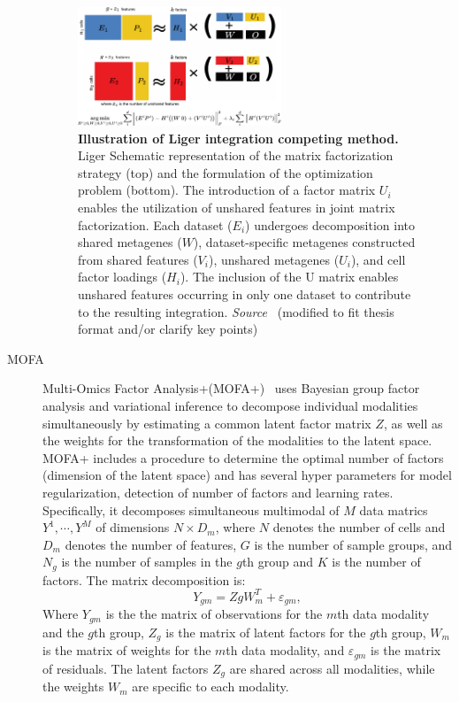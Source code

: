 \begin{description}
  \begin{figure}[!ht]
  	\centering
  	\includegraphics[width=0.6\textwidth]{Alg_Liger/fig}
  	\vspace{0.1cm}
  	\caption[Illustration of Liger integration competing method.]{\textbf{Illustration of Liger integration competing method.} Liger Schematic representation of the matrix factorization strategy (top) and the formulation of the optimization problem (bottom). The introduction of a factor matrix $U_i$ enables the utilization of unshared features in joint matrix factorization. Each dataset ($E_i$) undergoes decomposition into shared metagenes ($W$), dataset-specific metagenes constructed from shared features ($V_i$), unshared metagenes ($U_i$), and cell factor loadings ($H_i$). The inclusion of the U matrix enables unshared features occurring in only one dataset to contribute to the resulting integration. \emph{Source~\cite{kriebel2022uinmf}} (modified to fit thesis format and/or clarify key points)
  }
  	\label{fig:Alg_Liger}
  \end{figure}

  \item[MOFA]
  Multi-Omics Factor Analysis+(MOFA+)~\citep{argelaguet2020mofa+} uses Bayesian group factor analysis and variational inference to decompose individual modalities simultaneously by estimating a common latent factor matrix $Z$, as well as the weights for the transformation of the modalities to the latent space. MOFA+ includes a procedure to determine the optimal number of factors (dimension of the latent space) and has several hyper parameters for model regularization, detection of number of factors and learning rates. Specifically, it decomposes simultaneous multimodal of $M$ data matrics $Y^1, \cdots, Y^M$ of dimensions $N\times D_m$, where $N$ denotes the number of cells and $D_m$ denotes the number of features, $G$ is the number of sample groups, and $N_g$ is the number of samples in the $g$th group and $K$ is the number of factors. The matrix decomposition is:
  \begin{equation}
  Y_{gm} = ZgW_m^{T} + \varepsilon_{gm},
  \end{equation}
  Where $Y_{gm}$ is the the matrix of observations for the $m$th data modality and the $g$th group, $Z_g$ is the matrix of latent factors for the $g$th group, $W_m$ is the matrix of weights for the $m$th data modality, and $\varepsilon_{gm}$ is the matrix of residuals. The latent factors $Z_g$ are shared across all modalities, while the weights $W_m$ are specific to each modality. %


\end{description}
